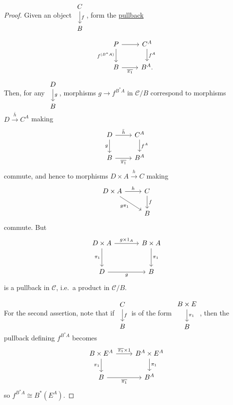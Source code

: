 \documentclass{article}
\let\to\longrightarrow
\begin{document}
\begin{proof}
  Given an object $\begin{tikzcd}C \dar{f} \\ B\end{tikzcd}$, form the \hyperlink{def:pullback}{pullback}
  \begin{equation*}
    \begin{tikzcd}
      P \rar \dar[']{f^{(B^*A)}} & C^A \dar{f^A}\\
      B \rar[']{\overline{\pi_1}} & B^A.
    \end{tikzcd}
  \end{equation*}
  Then, for any $\begin{tikzcd}D \dar{g} \\ B\end{tikzcd}$, morphisms $g \to f^{B^*A}$ in $\mathscr{C}/B$ correspond to morphisms $D \overset{\bar{h}}\to C^A$ making
  \begin{equation*}
  \begin{tikzcd}
    D \rar{\bar{h}} \dar[']{g} & C^A \dar{f^A} \\ B \rar[']{\overline{\pi_1}} & B^A
  \end{tikzcd}
  \end{equation*}
  commute, and hence to morphisms $D \times A \overset{h}\to C$ making
  \begin{equation*}
  \begin{tikzcd}
    D\times A \rar{h} \drar[']{g \pi_1} & C \dar{f} \\
                                     & B
  \end{tikzcd}
  \end{equation*}
  commute. But
  \begin{equation*}
    \begin{tikzcd}[sep=large]
      D \times A \rar{g \times 1_A} \dar[']{\pi_1} & B \times A \dar{\pi_1} \\
      D \rar[']{g} & B
    \end{tikzcd}
  \end{equation*}
  is a pullback in $\mathscr{C}$, i.e.\ a product in \hyperlink{def:slice}{$\mathscr{C}/B$}.

  For the second assertion, note that if $\begin{tikzcd}C \dar{f} \\ B\end{tikzcd}$ is of the form $\begin{tikzcd}B \times E \dar{\pi_1} \\ B\end{tikzcd}$, then the pullback defining $f^{B^* A}$ becomes
  \begin{equation*}
  \begin{tikzcd}
    B \times E^A \rar{\overline{\pi_1} \times 1} \dar[']{\pi_1} & B^A \times E^A \dar{\pi_1} \\
    B \rar[']{\overline{\pi_1}} & B^A
  \end{tikzcd}
  \end{equation*}
  so $f^{B^* A} \cong B^*(E^A)$.
\end{proof}
\end{document}

